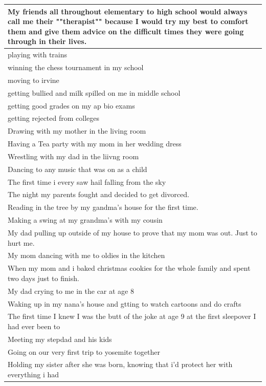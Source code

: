 \documentclass[
  .7em,
  letterpaper,
  DIV=11,
  numbers=noendperiod]{scrartcl}
\begin{document}
\begin{table}
\begin{tabular}{l}
\hline
My friends all throughout elementary to high school would always call me their ""therapist"" because I would try my best to comfort them and give them advice on the difficult times they were going through in their lives.\\
\hline
playing with trains\\
\hline
winning the chess tournament in my school\\
\hline
moving to irvine\\
\hline
getting bullied and milk spilled on me in middle school\\
\hline
getting good grades on my ap bio exams\\
\hline
getting rejected from colleges\\
\hline
Drawing with my mother in the living room\\
\hline
Having a Tea party with my mom in her wedding dress\\
\hline
Wrestling with my dad in the liivng room\\
\hline
Dancing to any music that was on as a child\\
\hline
The first time i every saw hail falling from the sky\\
\hline
The night my parents fought and decided to get divorced.\\
\hline
Reading in the tree by my gandma's house for the first time.\\
\hline
Making a swing at my grandma's with my cousin\\
\hline
My dad pulling up outside of my house to prove that my mom was out. Just to hurt me.\\
\hline
My mom dancing with me to oldies in the kitchen\\
\hline
When my mom and i baked christmas cookies for the whole family and spent two days just to finish.\\
\hline
My dad crying to me in the car at age 8\\
\hline
Waking up in my nana's house and gtting to watch cartoons and do crafts\\
\hline
The first time I knew I was the butt of the joke at age 9 at the first sleepover I had ever been to\\
\hline
Meeting my stepdad and his kids\\
\hline
Going on our very first trip to yosemite together\\
\hline
Holding my sister after she was born, knowing that i'd protect her with everything i had\\

\end{tabular}
\end{table}
\end{document}
